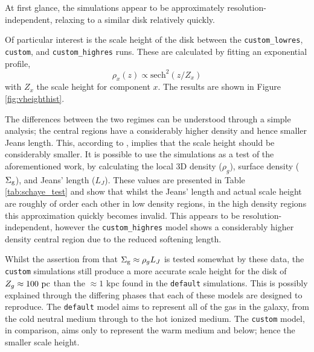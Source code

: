 At first glance, the simulations appear to be approximately resolution-independent, relaxing to a similar disk relatively quickly.

Of particular interest is the scale height of the disk between the {\tt custom\_lowres}, {\tt custom}, and {\tt custom\_highres} runs.
These are calculated by fitting an exponential profile,
\begin{equation}
    \rho_x(z) \propto \mathrm{sech}^2\left(z/Z_x\right)
    \label{eqn:vertprofile}
\end{equation}
with $Z_x$ the scale height for component $x$. The results are shown in Figure \ref{fig:vheighthist}.

The differences between the two regimes can be understood through a simple \citet{jeans_stability_1902} analysis; the central regions have a considerably higher density and hence smaller Jeans length.
This, according to \citet{schaye_model-independent_2001}, implies that the scale height should be considerably smaller.
It is possible to use the simulations as a test of the aforementioned work, by calculating the local 3D density ($\rho_g$), surface density ($\Sigma_\mathrm{g}$), and Jeans' length ($L_J$).
These values are presented in Table \ref{tab:schaye_test} and show that whilst the Jeans' length and actual scale height are roughly of order each other in low density regions, in the high density regions this approximation quickly becomes invalid.
This appears to be resolution-independent, however the {\tt custom\_highres} model shows a considerably higher density central region due to the reduced softening length.

Whilst the assertion from \citet{schaye_model-independent_2001} that $\Sigma_\mathrm{g} \approx \rho_g L_J$ is tested somewhat by these data, the {\tt custom} simulations still produce a more accurate scale height for the disk of $Z_g \approx 100 ~\mathrm{pc}$ than the $\approx 1$ kpc found in the {\tt default} simulations.
This is possibly explained through the differing phases that each of these models are designed to reproduce.
The {\tt default} model aims to represent all of the gas in the galaxy, from the cold neutral medium through to the hot ionized medium.
The {\tt custom} model, in comparison, aims only to represent the warm medium and below; hence the smaller scale height.

